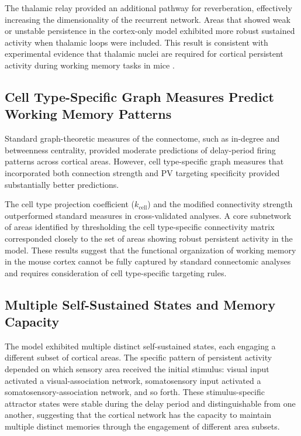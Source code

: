\documentclass[11pt]{article}
\begin{document}
The thalamic relay provided an additional pathway for reverberation, effectively increasing the dimensionality of the recurrent network. Areas that showed weak or unstable persistence in the cortex-only model exhibited more robust sustained activity when thalamic loops were included. This result is consistent with experimental evidence that thalamic nuclei are required for cortical persistent activity during working memory tasks in mice \citep{guo2017,bolkan2017}.

\subsection{Cell Type-Specific Graph Measures Predict Working Memory Patterns}

Standard graph-theoretic measures of the connectome, such as in-degree and betweenness centrality, provided moderate predictions of delay-period firing patterns across cortical areas. However, cell type-specific graph measures that incorporated both connection strength and PV targeting specificity provided substantially better predictions.

The cell type projection coefficient ($k_{\text{cell}}$) and the modified connectivity strength outperformed standard measures in cross-validated analyses. A core subnetwork of areas identified by thresholding the cell type-specific connectivity matrix corresponded closely to the set of areas showing robust persistent activity in the model. These results suggest that the functional organization of working memory in the mouse cortex cannot be fully captured by standard connectomic analyses and requires consideration of cell type-specific targeting rules.

\subsection{Multiple Self-Sustained States and Memory Capacity}

The model exhibited multiple distinct self-sustained states, each engaging a different subset of cortical areas. The specific pattern of persistent activity depended on which sensory area received the initial stimulus: visual input activated a visual-association network, somatosensory input activated a somatosensory-association network, and so forth. These stimulus-specific attractor states were stable during the delay period and distinguishable from one another, suggesting that the cortical network has the capacity to maintain multiple distinct memories through the engagement of different area subsets.
\end{document}
